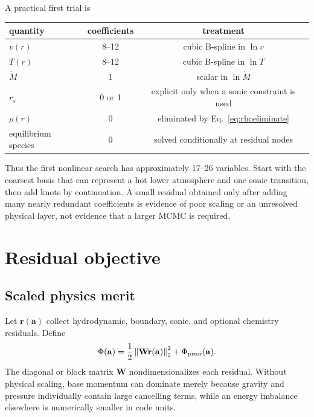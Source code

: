 \documentclass[english,a4paper]{my_memo}
\newcommand{\vect}[1]{\mathbf{#1}}
\newcommand{\coef}{\vect{a}}
\newcommand{\mdot}{\dot M}
\begin{document}
A practical first trial is
\begin{center}
\begin{tabular}{lcc}
\toprule
quantity & coefficients & treatment \\
\midrule
\(v(r)\) & 8--12 & cubic B-spline in \(\ln v\) \\
\(T(r)\) & 8--12 & cubic B-spline in \(\ln T\) \\
\(\mdot\) & 1 & scalar in \(\ln\mdot\) \\
\(r_s\) & 0 or 1 & explicit only when a sonic constraint is used \\
\(\rho(r)\) & 0 & eliminated by Eq.~\eqref{eq:rhoeliminate} \\
equilibrium species & 0 & solved conditionally at residual nodes \\
\bottomrule
\end{tabular}
\end{center}
Thus the first nonlinear search has approximately 17--26 variables.  Start with
the coarsest basis that can represent a hot lower atmosphere and one sonic
transition, then add knots by continuation.  A small residual obtained only
after adding many nearly redundant coefficients is evidence of poor scaling or
an unresolved physical layer, not evidence that a larger MCMC is required.

\section{Residual objective}\label{sec:objectivefun}

\subsection{Scaled physics merit}

Let \(\vect{r}(\coef)\) collect hydrodynamic, boundary, sonic, and optional
chemistry residuals.  Define
\begin{equation}
 \Phi(\coef)=\frac{1}{2}\left\|\vect{W}\vect{r}(\coef)\right\|_2^2
             +\Phi_{\rm prior}(\coef).
 \label{eq:merit}
\end{equation}
The diagonal or block matrix \(\vect{W}\) nondimensionalizes each residual.
Without physical scaling, base momentum can dominate merely because gravity and
pressure individually contain large cancelling terms, while an energy imbalance
elsewhere is numerically smaller in code units.
\end{document}
